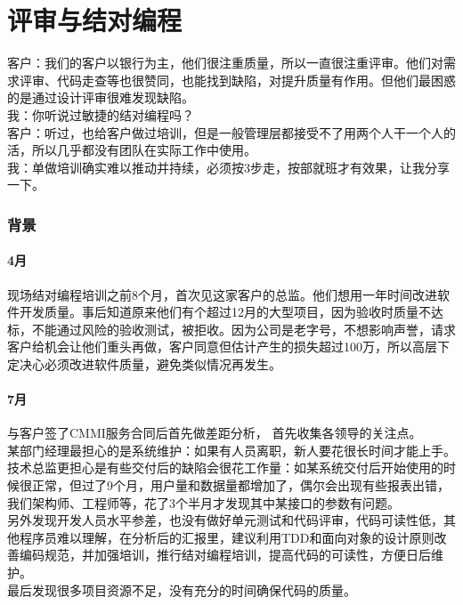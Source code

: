 \chapter{评审与结对编程} %

客户：我们的客户以银行为主，他们很注重质量，所以一直很注重评审。他们对需求评审、代码走查等也很赞同，也能找到缺陷，对提升质量有作用。但他们最困惑的是通过设计评审很难发现缺陷。\\
我：你听说过敏捷的结对编程吗？\\
客户：听过，也给客户做过培训，但是一般管理层都接受不了用两个人干一个人的活，所以几乎都没有团队在实际工作中使用。\\
我：单做培训确实难以推动并持续，必须按3步走，按部就班才有效果，让我分享一下。

\hypertarget{ux80ccux666f}{%
\subsection{背景}\label{ux80ccux666f}}

\hypertarget{ux6708}{%
\subsubsection{4月}\label{ux6708}}

现场结对编程培训之前8个月，首次见这家客户的总监。他们想用一年时间改进软件开发质量。事后知道原来他们有个超过12月的大型项目，因为验收时质量不达标，不能通过风险的验收测试，被拒收。因为公司是老字号，不想影响声誉，请求客户给机会让他们重头再做，客户同意但估计产生的损失超过100万，所以高层下定决心必须改进软件质量，避免类似情况再发生。

\hypertarget{ux6708-1}{%
\subsubsection{7月}\label{ux6708-1}}

与客户签了CMMI服务合同后首先做差距分析， 首先收集各领导的关注点。\\
某部门经理最担心的是系统维护：如果有人员离职，新人要花很长时间才能上手。\\
技术总监更担心是有些交付后的缺陷会很花工作量：如某系统交付后开始使用的时候很正常，但过了9个月，用户量和数据量都增加了，偶尔会出现有些报表出错，我们架构师、工程师等，花了3个半月才发现其中某接口的参数有问题。\\
另外发现开发人员水平参差，也没有做好单元测试和代码评审，代码可读性低，其他程序员难以理解，在分析后的汇报里，建议利用TDD和面向对象的设计原则改善编码规范，并加强培训，推行结对编程培训，提高代码的可读性，方便日后维护。\\
最后发现很多项目资源不足，没有充分的时间确保代码的质量。

